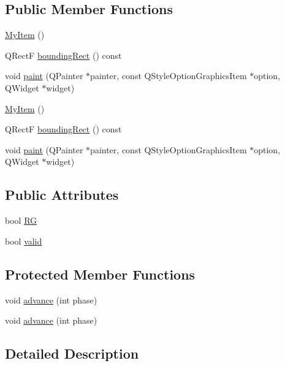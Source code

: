 \subsection*{Public Member Functions}
\begin{DoxyCompactItemize}
\item 
\hyperlink{class_my_item_a9507a67820323a0c2fca0023aed44fed}{My\+Item} ()
\item 
Q\+RectF \hyperlink{class_my_item_ad287d7475bc642329fbc0e074bbe7458}{bounding\+Rect} () const 
\item 
void \hyperlink{class_my_item_ab038ec9fec1da2aba8fb9fa87d65b28d}{paint} (Q\+Painter $\ast$painter, const Q\+Style\+Option\+Graphics\+Item $\ast$option, Q\+Widget $\ast$widget)
\item 
\hyperlink{class_my_item_a9507a67820323a0c2fca0023aed44fed}{My\+Item} ()
\item 
Q\+RectF \hyperlink{class_my_item_ad287d7475bc642329fbc0e074bbe7458}{bounding\+Rect} () const 
\item 
void \hyperlink{class_my_item_ab038ec9fec1da2aba8fb9fa87d65b28d}{paint} (Q\+Painter $\ast$painter, const Q\+Style\+Option\+Graphics\+Item $\ast$option, Q\+Widget $\ast$widget)
\end{DoxyCompactItemize}
\subsection*{Public Attributes}
\begin{DoxyCompactItemize}
\item 
bool \hyperlink{class_my_item_a8062967505fab8ad3d54e71c04876c7f}{RG}
\item 
bool \hyperlink{class_my_item_aaeda1d0e2b67ff57fc2206c9e8d8e5e2}{valid}
\end{DoxyCompactItemize}
\subsection*{Protected Member Functions}
\begin{DoxyCompactItemize}
\item 
void \hyperlink{class_my_item_a0065ee31a5a17b10703e7edae0526814}{advance} (int phase)
\item 
void \hyperlink{class_my_item_a0065ee31a5a17b10703e7edae0526814}{advance} (int phase)
\end{DoxyCompactItemize}


\subsection{Detailed Description}


